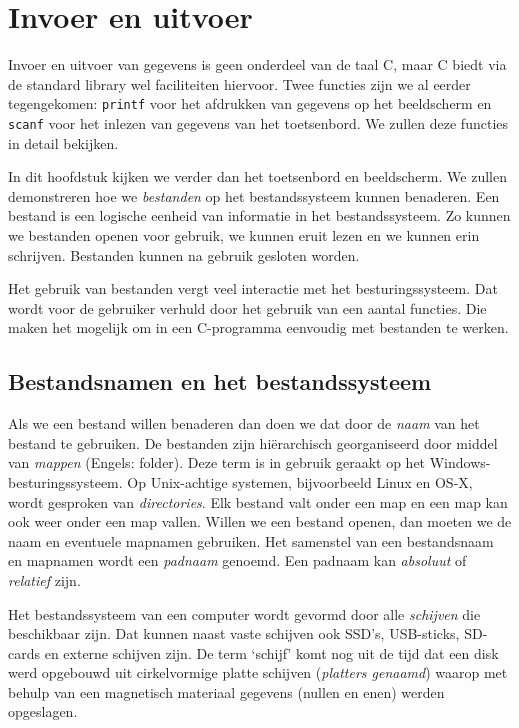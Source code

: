 \chapter{Invoer en uitvoer}
\label{cha:io}
\thispagestyle{empty}

Invoer en uitvoer van gegevens is geen onderdeel van de taal C, maar C biedt via de standard library wel faciliteiten hiervoor. Twee functies zijn we al eerder tegengekomen: \texttt{printf} voor het afdrukken van gegevens op het beeldscherm en \texttt{scanf} voor het inlezen van gegevens van het toetsenbord. We zullen deze functies in detail bekijken.

In dit hoofdstuk kijken we verder dan het toetsenbord en beeldscherm. We zullen demonstreren hoe we \textsl{bestanden} op het bestandssysteem kunnen benaderen. Een bestand is een logische eenheid van informatie in het bestandssysteem. Zo kunnen we bestanden openen voor gebruik, we kunnen eruit lezen en we kunnen erin schrijven. Bestanden kunnen na gebruik gesloten worden.

Het gebruik van bestanden vergt veel interactie met het besturingssysteem. Dat wordt voor de gebruiker verhuld door het gebruik van een aantal functies. Die maken het mogelijk om in een C-programma eenvoudig met bestanden te werken.


\section{Bestandsnamen en het bestandssysteem}
Als we een bestand willen benaderen dan doen we dat door de \textsl{naam} van het bestand te gebruiken. De bestanden zijn hiërarchisch georganiseerd door middel van \textsl{mappen} (Engels: folder). Deze term is in gebruik geraakt op het Windows-besturingssysteem. Op Unix-achtige systemen, bijvoorbeeld Linux en OS-X, wordt gesproken van \textsl{directories}. Elk bestand valt onder een map en een map kan ook weer onder een map vallen. Willen we een bestand openen, dan moeten we de naam en eventuele mapnamen gebruiken. Het samenstel van een bestandsnaam en mapnamen wordt een \textsl{padnaam} genoemd. Een padnaam kan \textsl{absoluut} of \textsl{relatief} zijn.

Het bestandssysteem van een computer wordt gevormd door alle \textsl{schijven} die beschikbaar zijn. Dat kunnen naast vaste schijven ook SSD's, USB-sticks, SD-cards en externe schijven zijn. De term `schijf' komt nog uit de tijd dat een disk werd opgebouwd uit cirkelvormige platte schijven (\textsl{platters genaamd}) waarop met behulp van een magnetisch materiaal gegevens (nullen en enen) werden opgeslagen.

